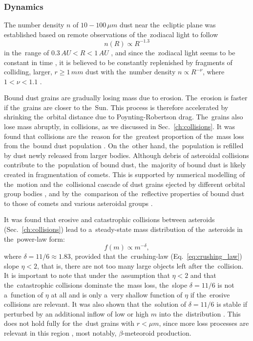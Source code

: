 \subsubsection{Dynamics}

The number density $n$ of $10 - 100 \, \si{\mu m}$ dust near the~ecliptic plane was established based on remote observations of the~zodiacal light to follow 
\begin{equation}
    n(R) \propto R^{-1.3} \label{eq:dust_number_density}
\end{equation}
in the~range of $0.3 \, \si{AU} < R < 1 \, \si{AU}$ \citep{leinert1981zodiacal}, and since the~zodiacal light seems to be constant in time \citep{buffington2016measurements}, it is believed to be constantly replenished by fragments of colliding, larger, $r \geq 1 \, \si{mm}$ dust with the~number density $n \propto R^{-\nu}$, where $1 < \nu < 1.1$ \citep{leinert1983maintain}.

Bound dust grains are gradually losing mass due to erosion. The~erosion is faster if the~grains are closer to the~Sun. This process is therefore accelerated by shrinking the~orbital distance due to Poynting-Robertson drag. The~grains also lose mass abruptly, in collisions, as we discussed in Sec.~\ref{ch:collisions}. It was found that collisions are the~reason for the~greatest proportion of the~mass loss from the~bound dust population \citep{grun1985collisional}. On the~other hand, the~population is refilled by dust newly released from larger bodies. Although debris of asteroidal collisions contribute to the~population of bound dust, the~majority of bound dust is likely created in fragmentation of comets. This is supported by numerical modelling of the~motion and the~collisional cascade of dust grains ejected by different orbital group bodies \citep{nesvorny2010cometary}, and by the~comparison of the~reflective properties of bound dust to those of comets and various asteroidal groups \citep{yang2015origin}. 

It was found \citep{dohnanyi1969collisional} that erosive and catastrophic collisions between asteroids (Sec.~\ref{ch:collisions}) lead to a~steady-state mass distribution of the~asteroids in the~power-law form: 
\begin{equation}
    f(m) \propto m^{-\delta}, \label{eq:mass_distribution}
\end{equation}
where $\delta = 11/6 \approx 1.83$, provided that the~crushing-law (Eq.~\ref{eq:crushing_law}) slope $\eta < 2$, that is, there are not too many large objects left after the~collision. It is important to note that under the~assumption that $\eta < 2$ and that the~catastrophic collisions dominate the~mass loss, the~slope $\delta = 11/6$ is not a~function of $\eta$ at all and is only a~very shallow function of $\eta$ if the~erosive collisions are relevant. It was also shown that the~solution of $\delta = 11/6$ is stable if perturbed by an additional inflow of low or high $m$ into the~distribution \citep{dohnanyi1969collisional}. This does not hold fully for the~dust grains with $r < \si{\mu m}$, since more loss processes are relevant in this region \citep{grun1985collisional}, most notably, $\beta$-meteoroid production.

